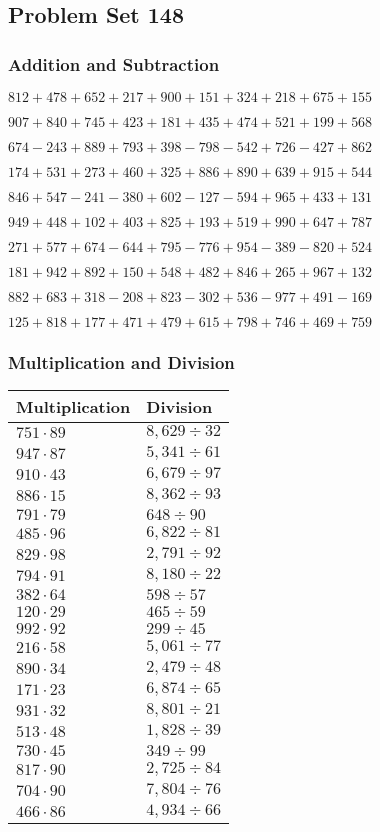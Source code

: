 \hypertarget{problem-set-148}{%
\subsection{Problem Set 148}\label{problem-set-148}}

\hypertarget{addition-and-subtraction}{%
\subsubsection{Addition and
Subtraction}\label{addition-and-subtraction}}

\(812 +478 +652 +217 +900 +151 +324 +218 +675 +155\)

\(907 +840 +745 +423 +181 +435 +474 +521 +199 +568\)

\(674 - 243 +889 +793 +398 - 798 - 542 +726 - 427 +862\)

\(174 +531 +273 +460 +325 +886 +890 +639 +915 +544\)

\(846 +547 - 241 - 380 +602 - 127 - 594 +965 +433 +131\)

\(949 +448 +102 +403 +825 +193 +519 +990 +647 +787\)

\(271 +577 +674 - 644 +795 - 776 +954 - 389 - 820 +524\)

\(181 +942 +892 +150 +548 +482 +846 +265 +967 +132\)

\(882 +683 +318 - 208 +823 - 302 +536 - 977 +491 - 169\)

\(125 +818 +177 +471 +479 +615 +798 +746 +469 +759\)

\hypertarget{multiplication-and-division}{%
\subsubsection{Multiplication and
Division}\label{multiplication-and-division}}

\begin{longtable}[]{@{}ll@{}}
\toprule
Multiplication & Division\tabularnewline
\midrule
\endhead
\(751 \cdot 89\) & \(8,629÷32\)\tabularnewline
\(947 \cdot 87\) & \(5,341÷61\)\tabularnewline
\(910 \cdot 43\) & \(6,679÷97\)\tabularnewline
\(886 \cdot 15\) & \(8,362÷93\)\tabularnewline
\(791 \cdot 79\) & \(648÷90\)\tabularnewline
\(485 \cdot 96\) & \(6,822÷81\)\tabularnewline
\(829 \cdot 98\) & \(2,791÷92\)\tabularnewline
\(794 \cdot 91\) & \(8,180÷22\)\tabularnewline
\(382 \cdot 64\) & \(598÷57\)\tabularnewline
\(120 \cdot 29\) & \(465÷59\)\tabularnewline
\(992 \cdot 92\) & \(299÷45\)\tabularnewline
\(216 \cdot 58\) & \(5,061÷77\)\tabularnewline
\(890 \cdot 34\) & \(2,479÷48\)\tabularnewline
\(171 \cdot 23\) & \(6,874÷65\)\tabularnewline
\(931 \cdot 32\) & \(8,801÷21\)\tabularnewline
\(513 \cdot 48\) & \(1,828÷39\)\tabularnewline
\(730 \cdot 45\) & \(349÷99\)\tabularnewline
\(817 \cdot 90\) & \(2,725÷84\)\tabularnewline
\(704 \cdot 90\) & \(7,804÷76\)\tabularnewline
\(466 \cdot 86\) & \(4,934÷66\)\tabularnewline
\bottomrule
\end{longtable}
